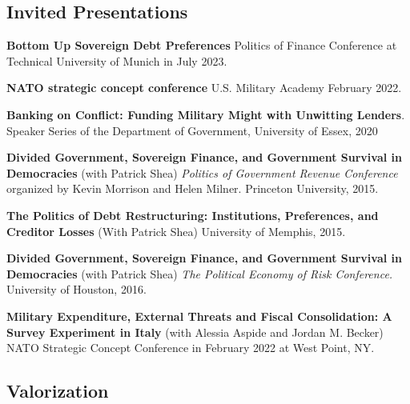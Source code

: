 \documentclass[letterpaper]{article}
\renewenvironment{itemize}{
  \begin{list}{}{
    \setlength{\leftmargin}{1.75em}
  }
}{
  \end{list}
}
\begin{document}
\subsection*{Invited Presentations}
\begin{itemize}

\item \textbf{Bottom Up Sovereign Debt Preferences} Politics of Finance Conference at Technical University of Munich in July 2023. 

\item \textbf{NATO strategic concept conference} U.S. Military Academy February 2022. 


\item \textbf{Banking on Conflict: Funding Military Might with Unwitting Lenders}. Speaker Series of the Department of Government, University of Essex, 2020 

\item \textbf{Divided Government, Sovereign Finance, and Government Survival in Democracies} (with Patrick Shea) \emph{Politics of Government Revenue Conference} organized by Kevin Morrison and Helen Milner. Princeton University, 2015.

\item \textbf{The Politics of Debt Restructuring: Institutions, Preferences, and Creditor Losses} (With Patrick Shea) University of Memphis, 2015.

\item \textbf{Divided Government, Sovereign Finance, and Government Survival in Democracies} (with Patrick Shea) \emph{The Political Economy of Risk Conference.} University of Houston, 2016.

\item \textbf{Military Expenditure, External Threats and Fiscal Consolidation: A Survey Experiment in Italy} (with Alessia Aspide and Jordan M. Becker) NATO Strategic Concept Conference in February 2022 at West Point, NY.  



\end{itemize}



\subsection*{Valorization}
\end{document}
